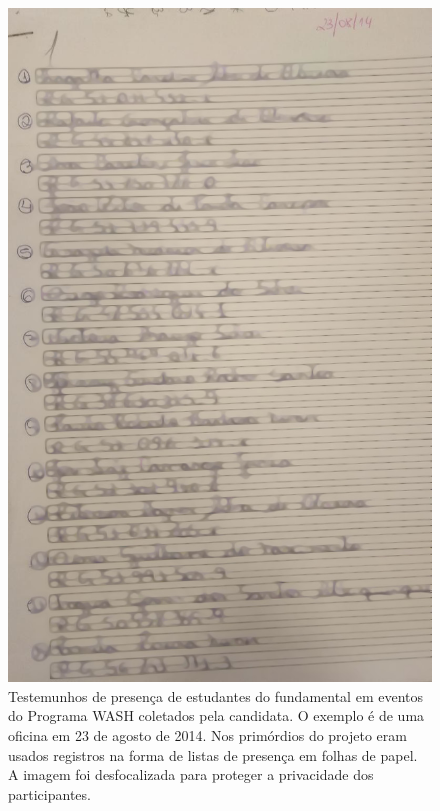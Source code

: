 \documentclass[
12pt,		%
openright,	%
twoside,  %
a4paper,			%
chapter=TITLE,		%
english,			%
french,				%
spanish,			%
brazil				%
]{USPSC-classe/USPSC}
\begin{document}
\captionsetup{format=plain}
\begin{figure}[max size={\textwidth}{\textheight}]

\centering


\begin{minipage}[b]{0.4\linewidth}
        \centering
                \includegraphics[width=1.0\linewidth]{../../imagens/blurred-Presenca-Oficina-2014-08-23.jpeg}
                \caption{Testemunhos de presen\c{c}a de estudantes do fundamental em eventos do Programa WASH coletados pela candidata. O exemplo \'e de uma oficina em 23 de agosto de 2014. Nos prim\'ordios do projeto eram usados registros na forma de listas de presen\c{c}a em folhas de papel. A imagem foi desfocalizada para proteger a privacidade dos participantes.}

\end{minipage}
\end{figure}
\end{document}
